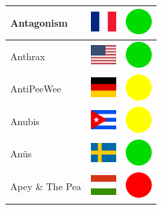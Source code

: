 \documentclass[12pt, a4paper, twoside]{report}
\begin{document}
\begin{center}
\begin{longtable}{|p{5cm}|p{2cm}|p{2cm}|}
Antagonism & \includegraphics[width=1cm]{4x3/fr} & \includegraphics[width=1cm]{likes/y} \\ \hline
Anthrax & \includegraphics[width=1cm]{4x3/us} & \includegraphics[width=1cm]{likes/y} \\ \hline
AntiPeeWee & \includegraphics[width=1cm]{4x3/de} & \includegraphics[width=1cm]{likes/m} \\ \hline
Anubis & \includegraphics[width=1cm]{4x3/cu} & \includegraphics[width=1cm]{likes/m} \\ \hline
Anüs & \includegraphics[width=1cm]{4x3/se} & \includegraphics[width=1cm]{likes/y} \\ \hline
Apey \& The Pea & \includegraphics[width=1cm]{4x3/hu} & \includegraphics[width=1cm]{likes/n} \\ \hline

\end{longtable}
\end{center}
\end{document}
